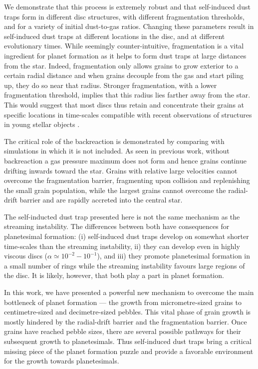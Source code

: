 \documentclass[a4paper,fleqn,usenatbib]{mnras}
\begin{document}
We demonstrate that this process is extremely robust and that self-induced dust traps form in different disc structures, with different fragmentation thresholds, and for a variety of initial dust-to-gas ratios.  Changing these parameters result in self-induced dust traps at different locations in the disc, and at different evolutionary times.  While seemingly counter-intuitive, fragmentation is a vital ingredient for planet formation as it helps to form dust traps at large distances from the star. Indeed, fragmentation only allows grains to grow exterior to a certain radial distance and when grains decouple from the gas and start piling up, they do so near that radius. Stronger fragmentation, with a lower fragmentation threshold, implies that this radius lies farther away from the star. This would suggest that most discs thus retain and concentrate their grains at specific locations in time-scales compatible with recent observations of structures in young stellar objects \citep{HLTau2015,Andrews2016}. 

The critical role of the backreaction is demonstrated by comparing with simulations in which it is not included. As seen in previous work, without backreaction a gas pressure maximum does not form and hence grains continue drifting inwards toward the star.  Grains with relative large velocities cannot overcome the fragmentation barrier, fragmenting upon collision and replenishing the small grain population, while the largest grains cannot overcome the radial-drift barrier and are rapidly accreted into the central star.

The self-inducted dust trap presented here is not the same mechanism as the streaming instability. The differences between both have consequences for planetesimal formation: (i) self-induced dust traps develop on somewhat shorter time-scales than the streaming instability, ii) they can develop even in highly viscous discs ($\alpha \simeq 10^{-2} - 10^{-1}$), and iii) they promote planetesimal  formation in a small number of rings while the streaming instability favours large regions of the disc. It is likely, however, that both play a part in planet formation.

In this work, we have presented a powerful new mechanism to overcome the main bottleneck of planet formation --- the growth from micrometre-sized grains to centimetre-sized and decimetre-sized pebbles. This vital phase of grain growth is mostly hindered by the radial-drift barrier and the fragmentation barrier. Once grains have reached pebble sizes, there are several possible pathways for their subsequent growth to planetesimals. Thus self-induced dust traps bring a critical missing piece of the planet formation puzzle and provide a favorable environment for the growth towards planetesimals.
\end{document}
